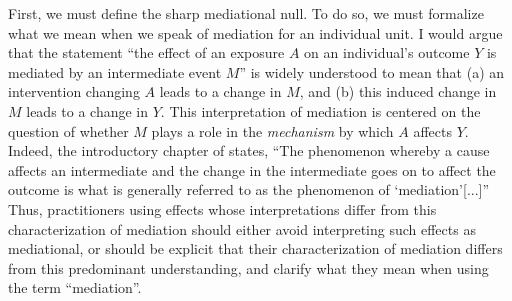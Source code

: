 \documentclass[12pt]{article}
\begin{document}
First, we must define the sharp mediational null. To do so, we must formalize what we mean when we speak of mediation for an individual unit. %
I would argue that the statement ``the effect of an exposure $A$ on an individual's outcome $Y$ is mediated by an intermediate event $M$'' is widely understood %
to mean that %
(a) an intervention changing $A$ leads to a change in $M$, and (b) this induced change in $M$ leads to a change in $Y$. This interpretation of mediation is centered on the question of whether $M$ plays a role in the \emph{mechanism} by which $A$ affects $Y$. Indeed, the introductory chapter of \cite{vanderweele2015explanation} states, ``The phenomenon whereby a cause affects an intermediate and the change in the intermediate goes on to affect the outcome is what is generally referred to as the phenomenon of `mediation'[...]'' Thus, practitioners using effects whose interpretations differ from this characterization of mediation should either avoid interpreting such effects as mediational, or should be explicit that their characterization of mediation differs from this predominant understanding, and clarify what they mean when using the term ``mediation''. 
\end{document}
